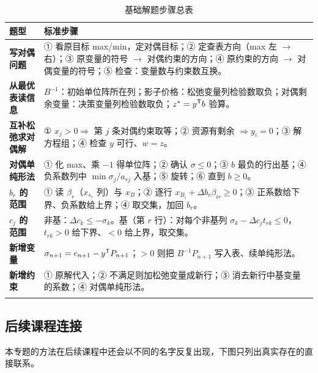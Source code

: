 {\small
\begin{xltabular}{\linewidth}{@{}>{\bfseries}p{2.3cm}>{\raggedright\arraybackslash}X@{}}
\toprule
{}题型 & 标准步骤\\\midrule
写对偶问题 & ① 看原目标 max/min，定对偶目标；② 定查表方向（max 左 $\to$ 右）；③ 原变量的符号 $\to$ 对偶约束的方向；④ 原约束的方向 $\to$ 对偶变量的符号；⑤ 检查：变量数与约束数互换。\\
从最优表读信息 & $B^{-1}$：初始单位阵所在列；影子价格：松弛变量列检验数取负；对偶剩余变量：决策变量列检验数取负；$z^*=y^{\mathsf T} b$ 验算。\\
互补松弛求对偶解 & ① $x_j>0\Rightarrow$ 第 $j$ 条对偶约束取等；② 资源有剩余 $\Rightarrow y_i=0$；③ 解方程组；④ 检查 $y$ 可行、$w=z$。\\
对偶单纯形法 & ① 化 max、乘 $-1$ 得单位阵；② 确认 $\sigma\le0$；③ $b$ 最负的行出基；④ 负系数列中 $\min\sigma_j/a_{rj}$ 入基；⑤ 旋转；⑥ 直到 $b\ge0$。\\
$b_r$ 的范围 & ① 读 $\beta_r$（$x_{s_r}$ 列）与 $x_B$；② 逐行 $x_{B_i}+\Delta b_r\beta_{ir}\ge0$；③ 正系数给下界、负系数给上界；④ 取交集，加回 $b_r$。\\
$c_j$ 的范围 & 非基：$\Delta c_k\le-\sigma_k$。基（第 $r$ 行）：对每个非基列 $\sigma_k-\Delta c_jt_{rk}\le0$，$t_{rk}>0$ 给下界、$<0$ 给上界，取交集。\\
新增变量 & $\sigma_{n+1}=c_{n+1}-y^{\mathsf T} P_{n+1}$；$>0$ 则把 $B^{-1}P_{n+1}$ 写入表、续单纯形法。\\
新增约束 & ① 原解代入；② 不满足则加松弛变量成新行；③ 消去新行中基变量的系数；④ 对偶单纯形法。\\\bottomrule
\caption{基础解题步骤总表}\\
\end{xltabular}}


\subsection{后续课程连接}

本专题的方法在后续课程中还会以不同的名字反复出现，下图只列出真实存在的直接联系。

